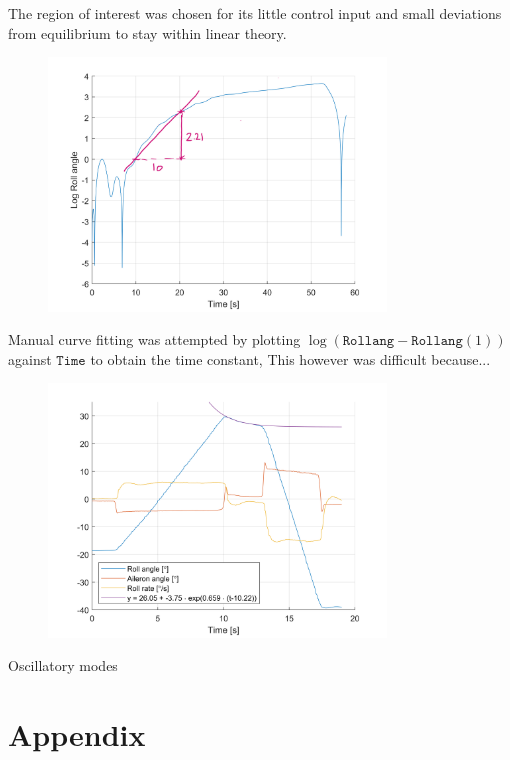 \documentclass{article}
\begin{document}
The region of interest was chosen for its little control input and small deviations from equilibrium to stay within linear theory.

\begin{figure}[H]
  \centering
  \includegraphics[width=0.8\textwidth]{figures/anSpiral_log.png}
  \caption{}
  \label{fig:spiral_log}
\end{figure}

Manual curve fitting was attempted by plotting $\log(\texttt{Rollang} - \texttt{Rollang}(1))$ against $\texttt{Time}$ to obtain the time constant,
This however was difficult because...

\begin{figure}[H]
  \centering
  \includegraphics[width=0.8\textwidth]{figures/RollSubs.png}
  \caption{}
  \label{fig:rollsubs}
\end{figure}

Oscillatory modes


\section{Appendix}
\end{document}
